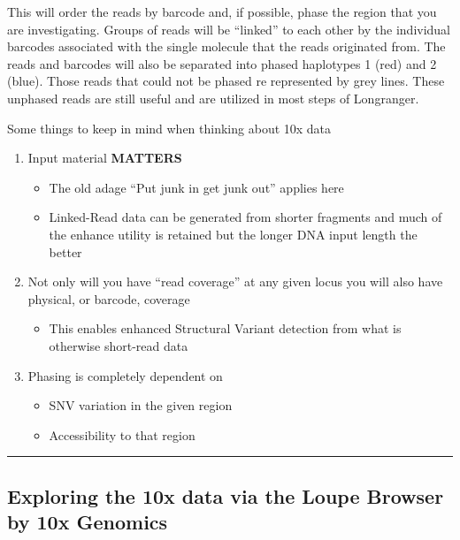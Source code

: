 \documentclass[]{article}
\providecommand{\tightlist}{%
  \setlength{\itemsep}{0pt}\setlength{\parskip}{0pt}}
\begin{document}
This will order the reads by barcode and, if possible, phase the region
that you are investigating. Groups of reads will be ``linked'' to each
other by the individual barcodes associated with the single molecule
that the reads originated from. The reads and barcodes will also be
separated into phased haplotypes 1 (red) and 2 (blue). Those reads that
could not be phased re represented by grey lines. These unphased reads
are still useful and are utilized in most steps of Longranger.

Some things to keep in mind when thinking about 10x data

\begin{enumerate}
\def\labelenumi{\arabic{enumi}.}
\tightlist
\item
  Input material \textbf{MATTERS}

  \begin{itemize}
  \tightlist
  \item
    The old adage ``Put junk in get junk out'' applies here
  \item
    Linked-Read data can be generated from shorter fragments and much of
    the enhance utility is retained but the longer DNA input length the
    better
  \end{itemize}
\item
  Not only will you have ``read coverage'' at any given locus you will
  also have physical, or barcode, coverage

  \begin{itemize}
  \tightlist
  \item
    This enables enhanced Structural Variant detection from what is
    otherwise short-read data
  \end{itemize}
\item
  Phasing is completely dependent on

  \begin{itemize}
  \tightlist
  \item
    SNV variation in the given region
  \item
    Accessibility to that region
  \end{itemize}
\end{enumerate}

\begin{center}\rule{0.5\linewidth}{\linethickness}\end{center}

\subsection{\texorpdfstring{\textbf{Exploring the 10x data via the Loupe
Browser by 10x
Genomics}}{Exploring the 10x data via the Loupe Browser by 10x Genomics}}\label{exploring-the-10x-data-via-the-loupe-browser-by-10x-genomics}
\end{document}
